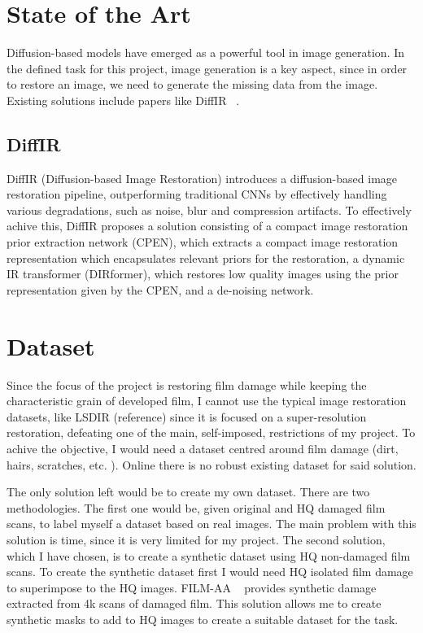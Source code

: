 \documentclass[openany, 12pt]{article}
\begin{document}
	\section{State of the Art}
	Diffusion-based models have emerged as a powerful tool in image generation. In the defined task for this project, image generation is a key aspect, since in order to restore an image, we need to generate the missing data from the image. 
	Existing solutions include papers like DiffIR ~\cite{xia_diffir_2023}.
	
	\subsection{DiffIR}
	DiffIR (Diffusion-based Image Restoration) introduces a diffusion-based image restoration pipeline, outperforming traditional CNNs by effectively handling various degradations, such as noise, blur and compression artifacts. To effectively achive this, DiffIR proposes a solution consisting of a compact image restoration prior extraction network (CPEN), which extracts a compact image restoration representation which encapsulates relevant priors for the restoration, a dynamic IR transformer (DIRformer), which restores low quality images using the prior representation given by the CPEN, and a de-noising network. 
	
	\section{Dataset}
	Since the focus of the project is restoring film damage while keeping the characteristic grain of developed film, I cannot use the typical image restoration datasets, like LSDIR (reference) since it is focused on a super-resolution restoration, defeating one of the main, self-imposed, restrictions of my project. 
	To achive the objective, I would need a dataset centred around film damage (dirt, hairs, scratches, etc. ). Online there is no robust existing dataset for said solution. 
	
	The only solution left would be to create my own dataset. There are two methodologies. The first one would be, given original and HQ damaged film scans, to label myself a dataset based on real images. The main problem with this solution is time, since it is very limited for my project. The second solution, which I have chosen, is to create a synthetic dataset using HQ non-damaged film scans. To create the synthetic dataset first I would need HQ isolated film damage to superimpose to the HQ images. FILM-AA ~\cite{ivanova23analogue} provides synthetic damage extracted from 4k scans of damaged film. This solution allows me to create synthetic masks to add to HQ images to create a suitable dataset for the task.
	
\end{document}

